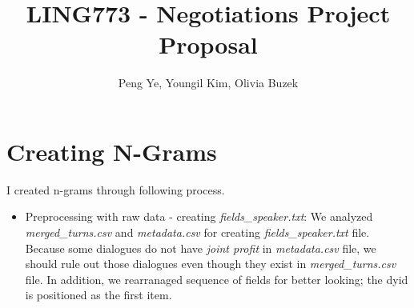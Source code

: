 \documentclass[11pt]{article} %
\title{LING773 - Negotiations Project Proposal}
\author{Peng Ye, Youngil Kim, Olivia Buzek}
\begin{document}
\maketitle

\section{Creating N-Grams}

I created n-grams through following process.
\begin{itemize}
\item Preprocessing with raw data - creating \textit{fields\_speaker.txt}: \newline
We analyzed \textit{merged\_turns.csv} and \textit{metadata.csv} for creating \textit{fields\_speaker.txt} file. Because some dialogues do not have \textit{joint profit} in \textit{metadata.csv} file, we should rule out those dialogues even though they exist in \textit{merged\_turns.csv} file. In addition, we rearranaged sequence of fields for better looking; the dyid is positioned as the first item.


\end{itemize}
\end{document}
